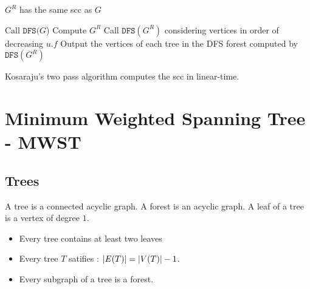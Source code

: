 \documentclass{cours}
\begin{document}
        \begin{proposition}
            $G^{R}$ has the same scc as $G$
        \end{proposition}

        \begin{algorithm}
            \begin{algorithmic}
                \State Call $\texttt{DFS}(G$) 
                \State Compute $G^{R}$
                \State Call $\texttt{DFS}(G^{R})$ considering vertices in order of decreasing $u.f$
                \Return Output the vertices of each tree in the DFS forest computed by $\texttt{DFS}(G^{R})$
            \end{algorithmic}
        \end{algorithm}

        \begin{theorem}
            Kosaraju's two pass algorithm computes the scc in linear-time.   
        \end{theorem}
        

        \section{Minimum Weighted Spanning Tree - MWST}
        \subsection{Trees}
        \begin{definition}
            A tree is a connected acyclic graph. A forest is an acyclic graph. A leaf of a tree is a vertex of degree $1$.
        \end{definition}

        \begin{proposition}
            \begin{itemize}
                \item Every tree contains at least two leaves
                \item Every tree $T$ satifies : $\left|E(T)\right| = \left|V(T)\right| - 1$.
                \item Every subgraph of a tree is a forest.
            \end{itemize}
        \end{proposition}
\end{document}
